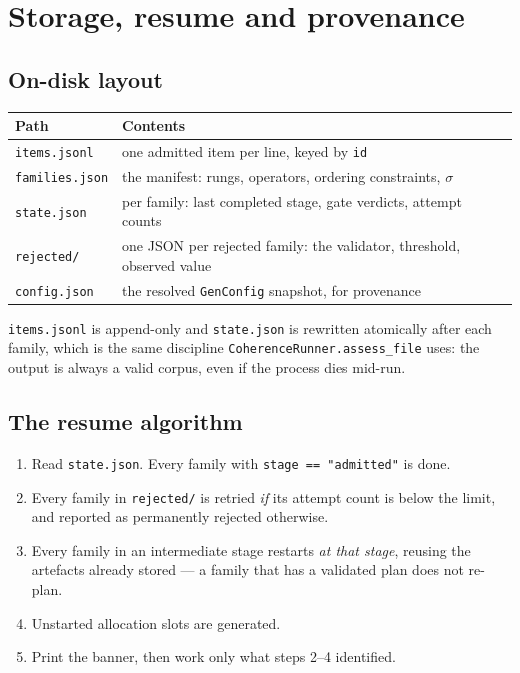 \documentclass[11pt]{article}
\begin{document}
\clearpage

\section{Storage, resume and provenance}
\label{sec:store}

\subsection{On-disk layout}

\begin{center}\small
\begin{tabular}{@{}ll@{}}
\toprule
\textbf{Path} & \textbf{Contents}\\
\midrule
\texttt{items.jsonl}      & one admitted item per line, keyed by \texttt{id}\\
\texttt{families.json}    & the manifest: rungs, operators, ordering constraints, $\sigma$\\
\texttt{state.json}       & per family: last completed stage, gate verdicts, attempt counts\\
\texttt{rejected/}        & one JSON per rejected family: the validator, threshold, observed value\\
\texttt{config.json}      & the resolved \texttt{GenConfig} snapshot, for provenance\\
\bottomrule
\end{tabular}
\end{center}

\texttt{items.jsonl} is append-only and \texttt{state.json} is rewritten atomically after each
family, which is the same discipline \texttt{CoherenceRunner.assess\_file} uses: the output is
always a valid corpus, even if the process dies mid-run.

\subsection{The resume algorithm}

\begin{enumerate}[leftmargin=*,nosep,label=\arabic*.]
  \item Read \texttt{state.json}. Every family with \texttt{stage == "admitted"} is done.
  \item Every family in \texttt{rejected/} is retried \emph{if} its attempt count is below the
        limit, and reported as permanently rejected otherwise.
  \item Every family in an intermediate stage restarts \emph{at that stage}, reusing the artefacts
        already stored --- a family that has a validated plan does not re-plan.
  \item Unstarted allocation slots are generated.
  \item Print the banner, then work only what steps 2--4 identified.
\end{enumerate}
\end{document}
